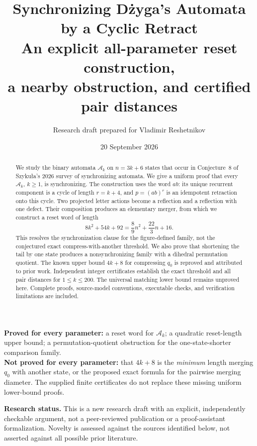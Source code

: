 \documentclass[11pt,a4paper]{article}
\title{\vspace{-12mm}\color{ink}\textbf{Synchronizing D\.{z}yga's Automata\\by a Cyclic Retract}\\[5pt]
\large An explicit all-parameter reset construction,\\a nearby obstruction, and certified pair distances}
\author{Research draft prepared for Vladimir Reshetnikov}
\date{20 September 2026}
\numberwithin{equation}{section}
\theoremstyle{definition}
\theoremstyle{remark}
\newcommand{\Ak}{\mathcal A_k}
\begin{document}
\maketitle
\thispagestyle{empty}

\begin{abstract}
We study the binary automata $\Ak$ on $n=3k+6$ states that occur in
Conjecture~8 of Szyku\l a's 2026 survey of synchronizing automata. We give
a uniform proof that every $\Ak$, $k\geq1$, is synchronizing. The construction
uses the word $ab$: its unique recurrent component is a cycle of length
$r=k+4$, and $p=(ab)^r$ is an idempotent retraction onto this cycle.
Two projected letter actions become a reflection and a reflection with one
defect. Their composition produces an elementary merger, from which we
construct a reset word of length
\[
8k^2+54k+92=\frac89 n^2+\frac{22}{3}n+16.
\]
This resolves the synchronization clause for the figure-defined family,
not the conjectured exact compress-with-another threshold. We also prove
that shortening the tail by one state produces a nonsynchronizing family
with a dihedral permutation quotient. The known upper bound $4k+8$ for
compressing $q_0$ is reproved and attributed to prior work. Independent
integer certificates establish the exact threshold and all pair distances
for $1\leq k\leq200$. The universal matching lower bound remains unproved
here. Complete proofs, source-model conventions, executable checks, and
verification limitations are included.
\end{abstract}

\begin{tcolorbox}[colback=pale,colframe=accent,boxrule=0.6pt,arc=1mm,
 title={\textbf{Scope of the result}},fonttitle=\normalsize]
\textbf{Proved for every parameter:} a reset word for $\Ak$; a quadratic
reset-length upper bound; a permutation-quotient obstruction for the
one-state-shorter comparison family.\\[3pt]
\textbf{Not proved for every parameter:} that $4k+8$ is the \emph{minimum}
length merging $q_0$ with another state, or the proposed exact formula for
the pairwise merging diameter. The supplied finite certificates do not
replace these missing uniform lower-bound proofs.
\end{tcolorbox}

\vfill
\noindent\small\textbf{Research status.} This is a new research draft with an
explicit, independently checkable argument, not a peer-reviewed publication
or a proof-assistant formalization. Novelty is assessed against the sources
identified below, not asserted against all possible prior literature.
\normalsize
\newpage
\tableofcontents
\newpage
\end{document}
